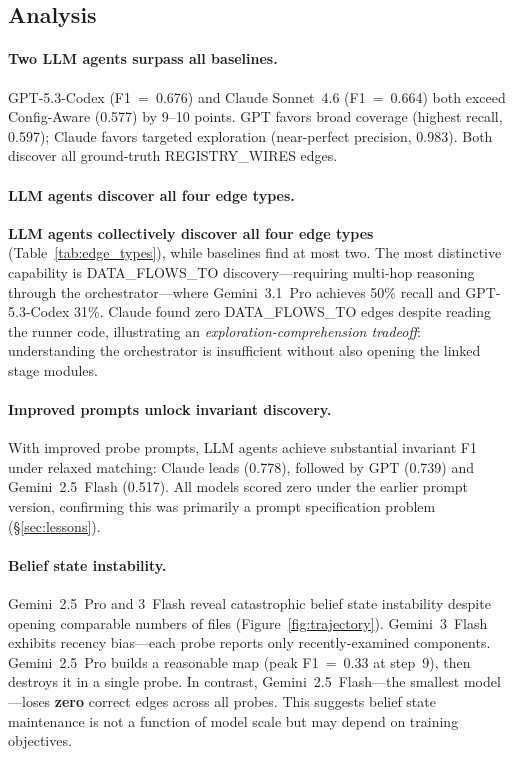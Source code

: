 \documentclass{article}
\begin{document}
\subsection{Analysis}

\paragraph{Two LLM agents surpass all baselines.}
GPT-5.3-Codex (F1~=~0.676) and Claude Sonnet~4.6 (F1~=~0.664) both exceed Config-Aware (0.577) by 9--10 points. GPT favors broad coverage (highest recall, 0.597); Claude favors targeted exploration (near-perfect precision, 0.983). Both discover all ground-truth REGISTRY\_WIRES edges.

\paragraph{LLM agents discover all four edge types.}
\textbf{LLM agents collectively discover all four edge types} (Table~\ref{tab:edge_types}), while baselines find at most two. The most distinctive capability is DATA\_FLOWS\_TO discovery---requiring multi-hop reasoning through the orchestrator---where Gemini~3.1~Pro achieves 50\% recall and GPT-5.3-Codex 31\%. Claude found zero DATA\_FLOWS\_TO edges despite reading the runner code, illustrating an \emph{exploration-comprehension tradeoff}: understanding the orchestrator is insufficient without also opening the linked stage modules.

\paragraph{Improved prompts unlock invariant discovery.}
With improved probe prompts, LLM agents achieve substantial invariant F1 under relaxed matching: Claude leads (0.778), followed by GPT (0.739) and Gemini~2.5~Flash (0.517). All models scored zero under the earlier prompt version, confirming this was primarily a prompt specification problem (\S\ref{sec:lessons}).

\paragraph{Belief state instability.}
Gemini~2.5~Pro and 3~Flash reveal catastrophic belief state instability despite opening comparable numbers of files (Figure~\ref{fig:trajectory}). Gemini~3~Flash exhibits recency bias---each probe reports only recently-examined components. Gemini~2.5~Pro builds a reasonable map (peak F1~=~0.33 at step~9), then destroys it in a single probe. In contrast, Gemini~2.5~Flash---the smallest model---loses \textbf{zero} correct edges across all probes. This suggests belief state maintenance is not a function of model scale but may depend on training objectives.
\end{document}
